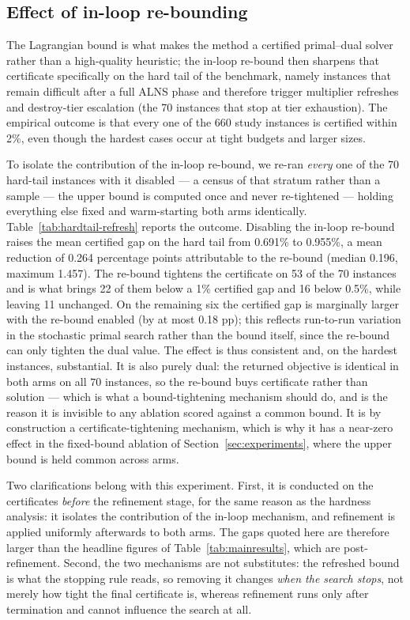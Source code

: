 \documentclass[preprint,12pt]{elsarticle}
\begin{document}
\subsection{Effect of in-loop re-bounding}

The Lagrangian bound is what makes the method a certified primal--dual solver rather than a high-quality heuristic; the in-loop re-bound then sharpens that certificate specifically on the hard tail of the benchmark, namely instances that remain difficult after a full ALNS phase and therefore trigger multiplier refreshes and destroy-tier escalation (the 70 instances that stop at tier exhaustion). The empirical outcome is that every one of the 660 study instances is certified within 2\%, even though the hardest cases occur at tight budgets and larger sizes.

To isolate the contribution of the in-loop re-bound, we re-ran \emph{every} one of the 70 hard-tail instances with it disabled --- a census of that stratum rather than a sample --- the upper bound is computed once and never re-tightened --- holding everything else fixed and warm-starting both arms identically. Table~\ref{tab:hardtail-refresh} reports the outcome. Disabling the in-loop re-bound raises the mean certified gap on the hard tail from 0.691\% to 0.955\%, a mean reduction of 0.264 percentage points attributable to the re-bound (median 0.196, maximum 1.457). The re-bound tightens the certificate on 53 of the 70 instances and is what brings 22 of them below a 1\% certified gap and 16 below 0.5\%, while leaving 11 unchanged. On the remaining six the certified gap is marginally larger with the re-bound enabled (by at most 0.18 pp); this reflects run-to-run variation in the stochastic primal search rather than the bound itself, since the re-bound can only tighten the dual value. The effect is thus consistent and, on the hardest instances, substantial. It is also purely dual: the returned objective is identical in both arms on all $70$ instances, so the re-bound buys certificate rather than solution --- which is what a bound-tightening mechanism should do, and is the reason it is invisible to any ablation scored against a common bound. It is by construction a certificate-tightening mechanism, which is why it has a near-zero effect in the fixed-bound ablation of Section~\ref{sec:experiments}, where the upper bound is held common across arms.

Two clarifications belong with this experiment. First, it is conducted on the certificates \emph{before} the refinement stage, for the same reason as the hardness analysis: it isolates the contribution of the in-loop mechanism, and refinement is applied uniformly afterwards to both arms. The gaps quoted here are therefore larger than the headline figures of Table~\ref{tab:mainresults}, which are post-refinement. Second, the two mechanisms are not substitutes: the refreshed bound is what the stopping rule reads, so removing it changes \emph{when the search stops}, not merely how tight the final certificate is, whereas refinement runs only after termination and cannot influence the search at all.
\end{document}
